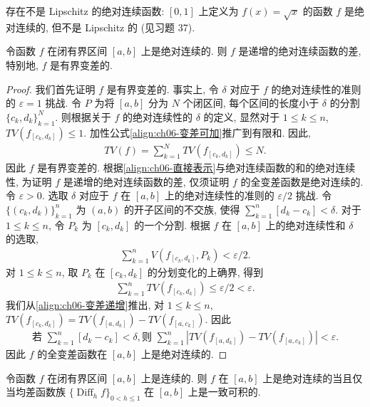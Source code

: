 \documentclass[../../main.tex]{subfiles}
\begin{document}
存在不是 Lipschitz 的绝对连续函数: $[0,1]$ 上定义为 $f(x)=\sqrt{x}$ 的函数 $f$ 是绝对连续的, 但不是 Lipschitz 的 (见习题 37).

\begin{theorem}\label{theorem:ch06-AC是递增差}
令函数 $f$ 在闭有界区间 $[a,b]$ 上是绝对连续的. 则 $f$ 是递增的绝对连续函数的差, 特别地, $f$ 是有界变差的.
\end{theorem}

\begin{proof}
我们首先证明 $f$ 是有界变差的. 事实上, 令 $\delta$ 对应于 $f$ 的绝对连续性的准则的 $\varepsilon=1$ 挑战. 令 $P$ 为将 $[a,b]$ 分为 $N$ 个闭区间, 每个区间的长度小于 $\delta$ 的分割 $\{c_{k},d_{k}\}_{k=1}^{N}$. 则根据关于 $f$ 的绝对连续性的 $\delta$ 的定义, 显然对于 $1\leqslant k\leqslant n$, $TV(f_{[c_{k},d_{k}]})\leqslant 1$. 加性公式\eqref{align:ch06-变差可加}推广到有限和. 因此,
\begin{align*}
TV(f)=\sum_{k=1}^{N}TV(f_{[c_{k},d_{k}]})\leqslant N.
\end{align*}
因此 $f$ 是有界变差的. 根据\eqref{align:ch06-直接表示}与绝对连续函数的和的绝对连续性, 为证明 $f$ 是递增的绝对连续函数的差, 仅须证明 $f$ 的全变差函数是绝对连续的. 令 $\varepsilon>0$. 选取 $\delta$ 对应于 $f$ 在 $[a,b]$ 上的绝对连续性的准则的 $\varepsilon/2$ 挑战. 令 $\{(c_{k},d_{k})\}_{k=1}^{n}$ 为 $(a,b)$ 的开子区间的不交族, 使得 $\sum_{k=1}^{n}[d_{k}-c_{k}]<\delta$. 对于 $1\leqslant k\leqslant n$, 令 $P_{k}$ 为 $[c_{k},d_{k}]$ 的一个分割. 根据 $f$ 在 $[a,b]$ 上的绝对连续性和 $\delta$ 的选取,
\begin{align*}
\sum_{k=1}^{n}V(f_{[c_{k},d_{k}]},P_{k})<\varepsilon/2.
\end{align*}
对 $1\leqslant k\leqslant n$, 取 $P_{k}$ 在 $[c_{k},d_{k}]$ 的分划变化的上确界, 得到
\begin{align*}
\sum_{k=1}^{n}TV(f_{[c_{k},d_{k}]})\leqslant\varepsilon/2<\varepsilon.
\end{align*}
我们从\eqref{align:ch06-变差递增}推出, 对 $1\leqslant k\leqslant n$, $TV(f_{[c_{k},d_{k}]})=TV(f_{[a,d_{k}]})-TV(f_{[a,c_{k}]})$. 因此
\begin{align}
\text{若 }\sum_{k=1}^{n}[d_{k}-c_{k}]<\delta,\text{则 }\sum_{k=1}^{n}|TV(f_{[a,d_{k}]})-TV(f_{[a,c_{k}]})|<\varepsilon.\label{align:ch06-变差AC}
\end{align}
因此 $f$ 的全变差函数在 $[a,b]$ 上是绝对连续的.
\end{proof}

\begin{theorem}\label{theorem:ch06-AC与一致可积}
令函数 $f$ 在闭有界区间 $[a,b]$ 上是连续的. 则 $f$ 在 $[a,b]$ 上是绝对连续的当且仅当均差函数族 $\{\operatorname{Diff}_{h}f\}_{0<h\leqslant 1}$ 在 $[a,b]$ 上是一致可积的.
\end{theorem}
\end{document}
